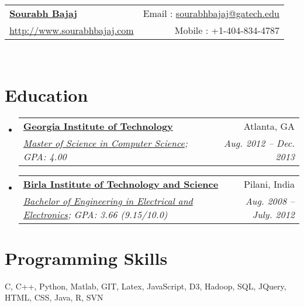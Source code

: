 \documentclass[letterpaper,11pt]{article}
\makeatletter
\newcommand{\reslistitem}[1]{\small{\item #1 \vspace{-6pt}}}
\newcommand{\ressubheadingold}[4]{
\begin{tabular*}{6.5in}{l@{\extracolsep{\fill}}r}
        \textbf{#1} & #2 \\
        \textit{\small#3} & \textit{\small #4} \\
\end{tabular*}\vspace{-6pt}}
\newcommand{\mywebheader}{
\begin{tabular*}{7in}{l@{\extracolsep{\fill}}r}
    \textbf{\href{http://www.cc.gatech.edu/~sbajaj9/}{\Large Sourabh Bajaj}} & Email : \href{mailto:sourabhbajaj@gatech.edu}{sourabhbajaj@gatech.edu}\\
    \href{http://sourabhbajaj.com/}{http://www.sourabhbajaj.com} & Mobile : \hspace{33pt} +1-404-834-4787
    \end{tabular*}
\\}
\makeatother
\begin{document}

\mywebheader

    
\section{Education}
    \begin{itemize}
        \item
            \ressubheadingold{\href{http://www.gatech.edu}{Georgia Institute of Technology}}{Atlanta, GA}{\href{http://www.cc.gatech.edu}{Master of Science in Computer Science}; 
            {GPA: 4.00}}{Aug. 2012 -- Dec. 2013}
        \item
            \ressubheadingold{\href{http://www.bits-pilani.ac.in}{Birla Institute of Technology and Science}}{Pilani, India}{\href{http://www.bits-pilani.ac.in/pilani/ElectricalElectronicsInstrumentation/Home}{Bachelor of Engineering in Electrical and Electronics}; 
            {GPA: 3.66 (9.15/10.0)}}{Aug. 2008 -- July. 2012} 
    \end{itemize} %

\vspace{1pt}

\section{Programming Skills}
    \begin{itemize}
        \reslistitem{ C, C++, Python, Matlab, GIT, Latex, JavaScript, D3, Hadoop, SQL, JQuery, HTML, CSS, Java, R, SVN}
    \end{itemize}
\end{document}
